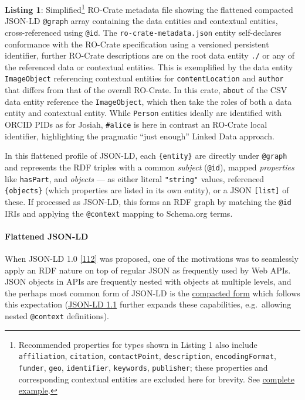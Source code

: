 \textbf{Listing 1}: Simplified\footnote{Recommended properties for types
  shown in Listing 1 also include \texttt{affiliation},
  \texttt{citation}, \texttt{contactPoint}, \texttt{description},
  \texttt{encodingFormat}, \texttt{funder}, \texttt{geo},
  \texttt{identifier}, \texttt{keywords}, \texttt{publisher}; these
  properties and corresponding contextual entities are excluded here for
  brevity. See
  \href{https://www.researchobject.org/2021-packaging-research-artefacts-with-ro-crate/listing1/}{complete
  example}.} RO-Crate metadata file showing the flattened compacted
JSON-LD \texttt{@graph} array containing the data entities and
contextual entities, cross-referenced using \texttt{@id}. The
\texttt{ro-crate-metadata.json} entity self-declares conformance with
the RO-Crate specification using a versioned persistent identifier,
further RO-Crate descriptions are on the root data entity \texttt{./} or
any of the referenced data or contextual entities. This is exemplified
by the data entity \texttt{ImageObject} referencing contextual entities
for \texttt{contentLocation} and \texttt{author} that differs from that
of the overall RO-Crate. In this crate, \texttt{about} of the CSV data
entity reference the \texttt{ImageObject}, which then take the roles of
both a data entity and contextual entity. While \texttt{Person} entities
ideally are identified with ORCID PIDs as for Josiah, \texttt{\#alice}
is here in contrast an RO-Crate local identifier, highlighting the
pragmatic ``just enough'' Linked Data approach. \normalsize

In this flattened profile of JSON-LD, each \texttt{\{entity\}} are
directly under \texttt{@graph} and represents the RDF triples with a
common \emph{subject} (\texttt{@id}), mapped \emph{properties} like
\texttt{hasPart}, and \emph{objects} --- as either literal
\texttt{"string"} values, referenced \texttt{\{objects\}} (which
properties are listed in its own entity), or a JSON \texttt{{[}list{]}}
of these. If processed as JSON-LD, this forms an RDF graph by matching
the \texttt{@id} IRIs and applying the \texttt{@context} mapping to
Schema.org terms. \normalsize

\hypertarget{flattened-json-ld}{%
\paragraph{Flattened JSON-LD}\label{flattened-json-ld}}

When JSON-LD 1.0
\href{https://www.w3.org/TR/2014/REC-json-ld-20140116/}{{[}112{]}} was
proposed, one of the motivations was to seamlessly apply an RDF nature
on top of regular JSON as frequently used by Web APIs. JSON objects in
APIs are frequently nested with objects at multiple levels, and the
perhaps most common form of JSON-LD is the
\href{https://json-ld.org/spec/REC/json-ld/20140116/\#compacted-document-form}{compacted
form} which follows this expectation
(\href{https://www.w3.org/TR/2020/REC-json-ld11-20200716/}{JSON-LD 1.1}
further expands these capabilities, e.g.~allowing nested
\texttt{@context} definitions).

